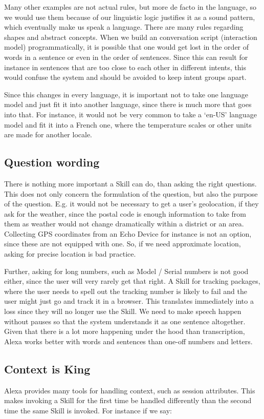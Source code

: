 Many other examples are not actual rules, but more de facto	in the language, so we would use them because of our linguistic logic justifies it as a sound pattern, which eventually make us speak a language. There are many rules regarding shapes and abstract concepts. When we build an conversation script (interaction model) programmatically, it is possible that one would get lost in the order of words in a sentence or even in the order of sentences. Since this can result for instance in sentences that are too close to each other in different intents, this would confuse the system and should be avoided to keep intent groups apart.

Since this changes in every language, it is important not to take one language model and just fit it into another language, since there is much more that goes into that. For instance, it would not be very common to take a `en-US' language model and fit it into a French one, where the temperature scales or other units are made for another locale.


\subsection*{Question wording}
There is nothing more important a Skill can do, than asking the right questions. This does not only concern the formulation of the question, but also the purpose of the question. E.g. it would not be necessary to get a user's geolocation, if they ask for the weather, since the postal code is enough information to take from them as weather would not change dramatically within a district or an area. Collecting GPS coordinates from an Echo Device for instance is not an option, since these are not equipped with one. So, if we need approximate location, asking for precise location is bad practice.

Further, asking for long numbers, such as Model / Serial numbers is not good either, since the user will very rarely get that right. A Skill for tracking packages, where the user needs to spell out the tracking number is likely to fail and the user might just go and track it in a browser. This translates immediately into a loss since they will no longer use the Skill. We need to make speech happen without pauses so that the system understands it as one sentence altogether. Given that there is a lot more happening under the hood than transcription, Alexa works better with words and sentences than one-off numbers and letters. 

\subsection*{Context is King}
Alexa provides many tools for handling context, such as session attributes. This makes invoking a Skill for the first time be handled differently than the second time the same Skill is invoked. For instance if we say:

